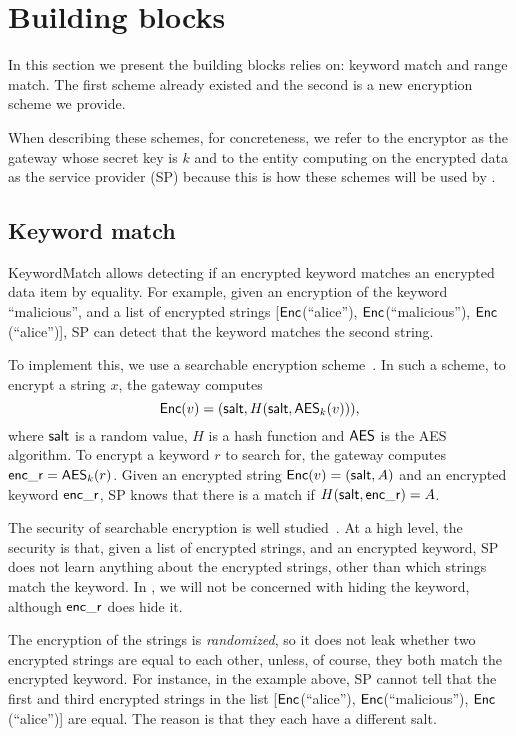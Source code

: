 


\section{Building blocks}

In this section we present the building blocks \sys relies on: keyword match and range match. The first scheme already existed and the second is a new encryption scheme we provide. 

When describing these schemes, for concreteness, we refer to the encryptor as the gateway whose secret key is $k$ and to the entity computing on the encrypted data as the service provider (SP) because this is how these schemes will be used by \sys.


\subsection{Keyword match}\label{s:kwmatch}


KeywordMatch allows detecting if an encrypted keyword matches an encrypted data item by equality.
For example, given an encryption of the keyword ``malicious'', and a list of encrypted strings  [$\mathsf{Enc}$(``alice''), $\mathsf{Enc}$(``malicious''), $\mathsf{Enc}$(``alice'')], SP can  detect that the keyword matches the second string. 

To implement this, we use a searchable encryption scheme~\cite{song:search, blindbox}.
In such a scheme, 
to encrypt a string $x$, the gateway computes 
\begin{equation}
\mathsf{Enc}(v) = (\mathsf{salt}, H(\mathsf{salt}, \mathsf{AES}_k(v))), \label{eq:KWMatchEnc}
\end{equation}
where $\mathsf{salt}$ is a random value, $H$ is a hash function and $\mathsf{AES}$ is the AES algorithm.
To encrypt a keyword $r$ to search for, the gateway computes $\mathsf{enc\_r} = \mathsf{AES}_k(r)$. 
Given an encrypted string $\mathsf{Enc}(v) = (\mathsf{salt}, A)$ and an encrypted keyword $\mathsf{enc\_r}$, SP knows that there is a match if  $H(\mathsf{salt}, \mathsf{enc\_r}) = A$.  

 The security of searchable encryption is well studied~\cite{song:search, blindbox}. At a high level, the security is that, given a list of encrypted strings, and an encrypted keyword, SP does not learn anything about the encrypted strings, other than which strings match the keyword. In \sys, we will not be concerned with hiding the keyword, although $\mathsf{enc\_r}$ does hide it. 

 The encryption of the strings is {\em randomized}, so it does not leak whether two encrypted strings are equal to each other, unless, of course, they both match the encrypted keyword. For instance, in the example above, SP cannot tell that the first and third encrypted strings 
in the list [$\mathsf{Enc}$(``alice''), $\mathsf{Enc}$(``malicious''), $\mathsf{Enc}$(``alice'')] are equal. The reason is that they each have a different salt.  


